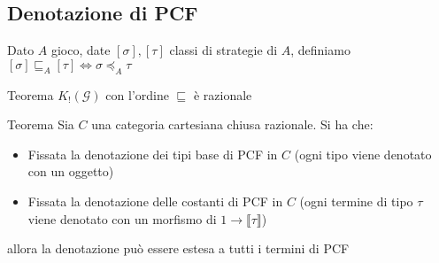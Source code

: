 \documentclass{beamer}
\begin{document}
\subsection{Denotazione di PCF}
\begin{frame}
	
	Dato $A$ gioco, date $[\sigma],[\tau]$ classi di strategie di $A$, definiamo
	$[\sigma] \sqsubseteq_A [\tau] \Leftrightarrow \sigma \preccurlyeq_A \tau$ \\
	\begin{block}{Teorema}
		$K_! (\mathcal{G})$ con l'ordine $\sqsubseteq$ è razionale
	\end{block}
	
	\begin{block}{Teorema}
		Sia $C$ una categoria cartesiana chiusa razionale. Si ha che:
		\begin{itemize}
			\item Fissata la denotazione dei tipi base di PCF in $C$ (ogni tipo viene denotato con un oggetto)
			\item Fissata la denotazione delle costanti di PCF in $C$ (ogni termine di tipo $\tau$ viene denotato con un morfismo di $1\rightarrow \llbracket \tau \rrbracket$)
		\end{itemize}
		allora la denotazione può essere estesa a tutti i termini di PCF
		
	\end{block}
	
\end{frame}
\end{document}
